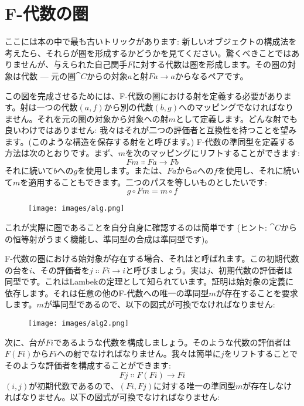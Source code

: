 \section{F-代数の圏}

ここには本の中で最も古いトリックがあります: 新しいオブジェクトの構成法を考えたら、それらが圏を形成するかどうかを見てください。驚くべきことではありませんが、与えられた自己関手$F$に対する代数は圏を形成します。その圏の対象は代数 --- 元の圏$\cat{C}$からの対象$a$と射$F a \to a$からなるペアです。

この図を完成させるためには、F-代数の圏における射を定義する必要があります。射は一つの代数$(a, f)$から別の代数$(b, g)$へのマッピングでなければなりません。それを元の圏の対象から対象への射$m$として定義します。どんな射でも良いわけではありません: 我々はそれが二つの評価者と互換性を持つことを望みます。(このような構造を保存する射をと呼びます。) F-代数の準同型を定義する方法は次のとおりです。まず、$m$を次のマッピングにリフトすることができます: 
\[F m \Colon F a \to F b\]
それに続いて$b$への$g$を使用します。または、$F a$から$a$への$f$を使用し、それに続いて$m$を適用することもできます。二つのパスを等しいものとしたいです: 
\[g \circ F m = m \circ f\]

\begin{figure}[H]
  \centering
  \texttt{[image: images/alg.png]}
\end{figure}

\noindent
これが実際に圏であることを自分自身に確認するのは簡単です (ヒント: $\cat{C}$からの恒等射がうまく機能し、準同型の合成は準同型です)。

F-代数の圏における始対象が存在する場合、それはと呼ばれます。この初期代数の台を$i$、その評価者を$j \Colon F i \to i$と呼びましょう。実は$j$、初期代数の評価者は同型です。これはLambekの定理として知られています。証明は始対象の定義に依存します。それは任意の他のF-代数への唯一の準同型$m$が存在することを要求します。$m$が準同型であるので、以下の図式が可換でなければなりません: 

\begin{figure}[H]
  \centering
  \texttt{[image: images/alg2.png]}
\end{figure}

\noindent
次に、台が$F i$であるような代数を構成しましょう。そのような代数の評価者は$F (F i)$から$F i$への射でなければなりません。我々は簡単に$j$をリフトすることでそのような評価者を構成することができます: 
\[F j \Colon F (F i) \to F i\]
$(i, j)$が初期代数であるので、$(F i, F j)$に対する唯一の準同型$m$が存在しなければなりません。以下の図式が可換でなければなりません: 

